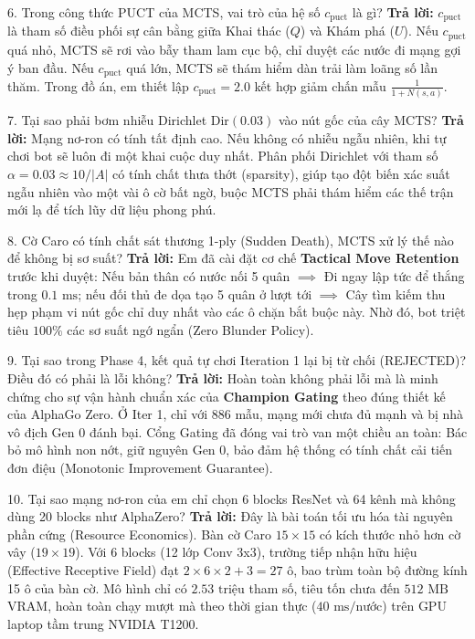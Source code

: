 \documentclass[12pt,a4paper,oneside]{report}
\begin{document}
\begin{defensebox}{6. Trong công thức PUCT của MCTS, vai trò của hệ số $c_{\text{puct}}$ là gì?}
\textbf{Trả lời:} $c_{\text{puct}}$ là tham số điều phối sự cân bằng giữa Khai thác ($Q$) và Khám phá ($U$). Nếu $c_{\text{puct}}$ quá nhỏ, MCTS sẽ rơi vào bẫy tham lam cục bộ, chỉ duyệt các nước đi mạng gợi ý ban đầu. Nếu $c_{\text{puct}}$ quá lớn, MCTS sẽ thám hiểm dàn trải làm loãng số lần thăm. Trong đồ án, em thiết lập $c_{\text{puct}} = 2.0$ kết hợp giảm chấn mẫu $\frac{1}{1 + N(s, a)}$.
\end{defensebox}

\begin{defensebox}{7. Tại sao phải bơm nhiễu Dirichlet $\text{Dir}(0.03)$ vào nút gốc của cây MCTS?}
\textbf{Trả lời:} Mạng nơ-ron có tính tất định cao. Nếu không có nhiễu ngẫu nhiên, khi tự chơi bot sẽ luôn đi một khai cuộc duy nhất. Phân phối Dirichlet với tham số $\alpha = 0.03 \approx 10/|A|$ có tính chất thưa thớt (sparsity), giúp tạo đột biến xác suất ngẫu nhiên vào một vài ô cờ bất ngờ, buộc MCTS phải thám hiểm các thế trận mới lạ để tích lũy dữ liệu phong phú.
\end{defensebox}

\begin{defensebox}{8. Cờ Caro có tính chất sát thương 1-ply (Sudden Death), MCTS xử lý thế nào để không bị sơ suất?}
\textbf{Trả lời:} Em đã cài đặt cơ chế \textbf{Tactical Move Retention} trước khi duyệt: Nếu bản thân có nước nối 5 quân $\implies$ Đi ngay lập tức để thắng trong $0.1\text{ ms}$; nếu đối thủ đe dọa tạo 5 quân ở lượt tới $\implies$ Cây tìm kiếm thu hẹp phạm vi nút gốc chỉ duy nhất vào các ô chặn bắt buộc này. Nhờ đó, bot triệt tiêu $100\%$ các sơ suất ngớ ngẩn (Zero Blunder Policy).
\end{defensebox}

\begin{defensebox}{9. Tại sao trong Phase 4, kết quả tự chơi Iteration 1 lại bị từ chối (REJECTED)? Điều đó có phải là lỗi không?}
\textbf{Trả lời:} Hoàn toàn không phải lỗi mà là minh chứng cho sự vận hành chuẩn xác của \textbf{Champion Gating} theo đúng thiết kế của AlphaGo Zero. Ở Iter 1, chỉ với 886 mẫu, mạng mới chưa đủ mạnh và bị nhà vô địch Gen 0 đánh bại. Cổng Gating đã đóng vai trò van một chiều an toàn: Bác bỏ mô hình non nớt, giữ nguyên Gen 0, bảo đảm hệ thống có tính chất cải tiến đơn điệu (Monotonic Improvement Guarantee).
\end{defensebox}

\begin{defensebox}{10. Tại sao mạng nơ-ron của em chỉ chọn 6 blocks ResNet và 64 kênh mà không dùng 20 blocks như AlphaZero?}
\textbf{Trả lời:} Đây là bài toán tối ưu hóa tài nguyên phần cứng (Resource Economics). Bàn cờ Caro $15 \times 15$ có kích thước nhỏ hơn cờ vây ($19 \times 19$). Với 6 blocks (12 lớp Conv 3x3), trường tiếp nhận hữu hiệu (Effective Receptive Field) đạt $2 \times 6 \times 2 + 3 = 27$ ô, bao trùm toàn bộ đường kính 15 ô của bàn cờ. Mô hình chỉ có $2.53\text{ triệu}$ tham số, tiêu tốn chưa đến $512\text{ MB}$ VRAM, hoàn toàn chạy mượt mà theo thời gian thực ($40\text{ ms/nước}$) trên GPU laptop tầm trung NVIDIA T1200.
\end{defensebox}
\end{document}
